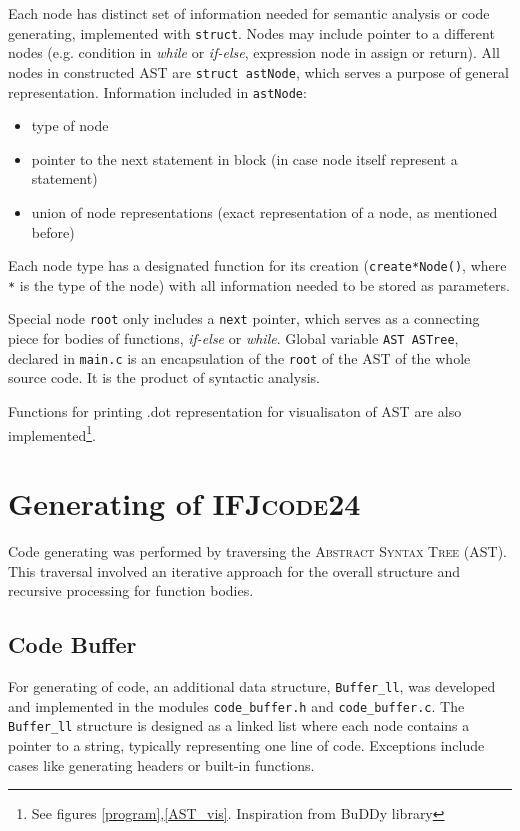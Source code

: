 \documentclass[a4paper, 11pt]{article}
\begin{document}
\newline
\par
Each node has distinct set of information needed for semantic analysis or code generating, implemented with
\verb|struct|. Nodes may include pointer to a different nodes (e.g. condition in \textit{while} or \textit{if-else}, expression node in assign or return).
All nodes in constructed AST are \verb|struct astNode|, which serves a purpose of general representation.
Information included in \verb|astNode|:
\begin{itemize}
    \item type of node
    \item pointer to the next statement in block (in case node itself represent a statement)
    \item union of node representations (exact representation of a node, as mentioned before)
\end{itemize}

Each node type has a designated function for its creation (\verb|create*Node()|, where \verb|*| is the type of the node)
with all information needed to be stored as parameters.
\par Special node \verb|root| only includes a \verb|next| pointer, which serves as a connecting piece for
bodies of functions, \textit{if-else} or \textit{while}. Global variable \verb|AST ASTree|, declared in \verb|main.c| is an
encapsulation of the \verb|root| of the AST of the whole source code. It is the product of syntactic analysis.
\par  Functions for printing .dot representation for visualisaton of AST are also implemented\footnote{See figures \ref{program},\ref{AST_vis}. Inspiration from BuDDy library}.

\section{Generating of \textsc{IFJcode24}}\label{sec:CODEGEN}

Code generating was performed by traversing the \textsc{Abstract Syntax Tree} (AST). This traversal involved an iterative approach for the overall structure and recursive processing for function bodies.

\subsection{Code Buffer}

For generating of code, an additional data structure, \verb|Buffer_ll|, was developed and implemented in the modules \verb|code_buffer.h| and \verb|code_buffer.c|. The \verb|Buffer_ll| structure is designed as a linked list where each node contains a pointer to a string, typically representing one line of code. Exceptions include cases like generating headers or built-in functions.
\end{document}
